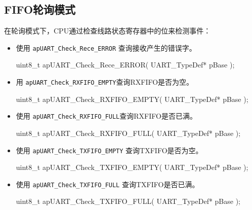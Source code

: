 \documentclass[
  12pt,
]{book}
\newenvironment{Shaded}{\begin{snugshade}}{\end{snugshade}}
\newcommand{\DataTypeTok}[1]{\textcolor[rgb]{0.13,0.29,0.53}{#1}}
\newcommand{\NormalTok}[1]{#1}
\begin{document}
\hypertarget{fifoux8f6eux8be2ux6a21ux5f0f}{%
\subsection{FIFO轮询模式}\label{fifoux8f6eux8be2ux6a21ux5f0f}}

在轮询模式下，CPU通过检查线路状态寄存器中的位来检测事件：

\begin{itemize}
\item
  使用 \texttt{apUART\_Check\_Rece\_ERROR} 查询接收产生的错误字。

\begin{Shaded}
\begin{Highlighting}[]
  \DataTypeTok{uint8_t}\NormalTok{ apUART_Check_Rece_ERROR(}
\NormalTok{    UART_TypeDef* pBase}
\NormalTok{    );}
\end{Highlighting}
\end{Shaded}
\item
  用 \texttt{apUART\_Check\_RXFIFO\_EMPTY}查询RXFIFO是否为空。

\begin{Shaded}
\begin{Highlighting}[]
  \DataTypeTok{uint8_t}\NormalTok{ apUART_Check_RXFIFO_EMPTY(}
\NormalTok{    UART_TypeDef* pBase}
\NormalTok{    );}
\end{Highlighting}
\end{Shaded}
\item
  使用 \texttt{apUART\_Check\_RXFIFO\_FULL}查询RXFIFO是否已满。

\begin{Shaded}
\begin{Highlighting}[]
  \DataTypeTok{uint8_t}\NormalTok{ apUART_Check_RXFIFO_FULL(}
\NormalTok{    UART_TypeDef* pBase}
\NormalTok{    );}
\end{Highlighting}
\end{Shaded}
\item
  使用 \texttt{apUART\_Check\_TXFIFO\_EMPTY} 查询TXFIFO是否为空。

\begin{Shaded}
\begin{Highlighting}[]
  \DataTypeTok{uint8_t}\NormalTok{ apUART_Check_TXFIFO_EMPTY(}
\NormalTok{    UART_TypeDef* pBase}
\NormalTok{    );}
\end{Highlighting}
\end{Shaded}
\item
  使用 \texttt{apUART\_Check\_TXFIFO\_FULL} 查询TXFIFO是否已满。

\begin{Shaded}
\begin{Highlighting}[]
  \DataTypeTok{uint8_t}\NormalTok{ apUART_Check_TXFIFO_FULL(}
\NormalTok{    UART_TypeDef* pBase}
\NormalTok{    ); }
\end{Highlighting}
\end{Shaded}
\end{itemize}
\end{document}
